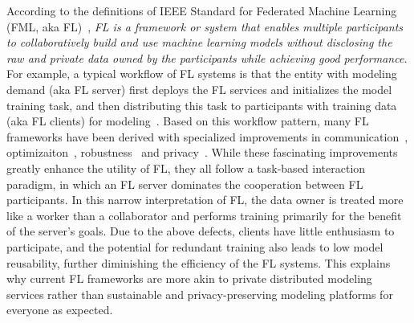 According to the definitions of IEEE Standard for Federated Machine Learning (FML, aka FL)~\cite{IEEEstd3652}, \textit{FL is a framework or system that enables multiple participants to collaboratively build and use machine learning models without disclosing the raw and private data owned by the participants while achieving good performance.}
For example, a typical workflow of FL systems is that the entity with modeling demand (aka FL server) first deploys the FL services and initializes the model training task, and then distributing this task to participants with training data (aka FL clients) for modeling~\cite{bonawitz2019towards}.
Based on this workflow pattern, many FL frameworks have been derived with specialized improvements in communication~\cite{konevcny2016federated, mcmahan2017communication, xu2021asynchronous}, optimizaiton~\cite{li2018federated, karimireddy2020scaffold, li2021model}, robustness~\cite{duan2020self, sattler2019robust, li2022federated} and privacy~\cite{bonawitz2017practical, geyer2017differentially, cheng2021secureboost}.
While these fascinating improvements greatly enhance the utility of FL, they all follow a task-based interaction paradigm, in which an FL server dominates the cooperation between FL participants.
In this narrow interpretation of FL, the data owner is treated more like a worker than a collaborator and performs training primarily for the benefit of the server's goals.
Due to the above defects, clients have little enthusiasm to participate, and the potential for redundant training also leads to low model reusability, further diminishing the efficiency of the FL systems.
This explains why current FL frameworks are more akin to private distributed modeling services rather than sustainable and privacy-preserving modeling platforms for everyone as expected.

